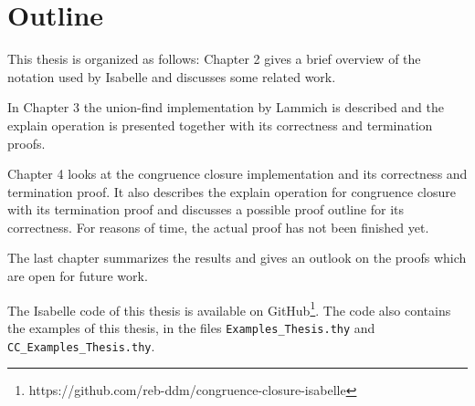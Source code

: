 \section{Outline}
This thesis is organized as follows: Chapter 2 gives a brief overview of the notation used by Isabelle and discusses some related work.

In Chapter 3 the union-find implementation by Lammich \cite{unionfind-isabelle} is described and the explain operation is presented together with its correctness and termination proofs.

Chapter 4 looks at the congruence closure implementation and its correctness and termination proof. It also describes the explain operation for congruence closure with its termination proof and discusses a possible proof outline for its correctness. For reasons of time, the actual proof has not been finished yet.

The last chapter summarizes the results and gives an outlook on the proofs which are open for future work.

The Isabelle code of this thesis is available on GitHub\footnote{https://github.com/reb-ddm/congruence-closure-isabelle}.
The code also contains the examples of this thesis, in the files \lstinline|Examples_Thesis.thy| and \lstinline|CC_Examples_Thesis.thy|.

